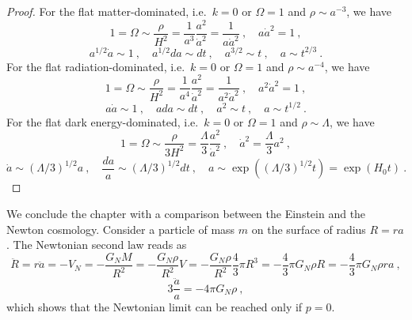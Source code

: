     \begin{proof}
        For the flat matter-dominated, i.e.~$k = 0$ or $\Omega = 1$ and $\rho \sim a^{-3}$, we have 
        \begin{equation*}
            1 = \Omega \sim \frac{\rho}{H^2} = \frac{1}{a^3} \frac{a^2}{\dot a^2}= \frac{1}{a \dot a^2} ~, \quad a \dot a^2 = 1 ~,
        \end{equation*}
        \begin{equation*}
            a^{1/2} \dot a \sim 1 ~, \quad a^{1/2} da \sim dt ~, \quad a^{3/2} \sim t ~, \quad a \sim t^{2/3} ~.
        \end{equation*}
        For the flat radiation-dominated, i.e.~$k = 0$ or $\Omega = 1$ and $\rho \sim a^{-4}$, we have 
        \begin{equation*}
            1 = \Omega \sim \frac{\rho}{H^2} = \frac{1}{a^4} \frac{a^2}{\dot a^2}= \frac{1}{a^2 \dot a^2} ~, \quad a^2 \dot a^2 = 1 ~,
        \end{equation*}
        \begin{equation*}
            a \dot a \sim 1 ~, \quad a da \sim dt ~, \quad a^2 \sim t ~, \quad a \sim t^{1/2} ~.
        \end{equation*}
        For the flat dark energy-dominated, i.e.~$k = 0$ or $\Omega = 1$ and $\rho \sim \Lambda$, we have 
        \begin{equation*}
            1 = \Omega \sim \frac{\rho}{3 H^2} = \frac{\Lambda}{3} \frac{a^2}{\dot a^2} ~, \quad \dot a^2 = \frac{\Lambda}{3} a^2 ~,
        \end{equation*}
        \begin{equation*}
            \dot a \sim (\Lambda/3)^{1/2} a ~, \quad \frac{da}{a} \sim (\Lambda/3)^{1/2} dt ~, \quad a \sim \exp ( (\Lambda/3)^{1/2} t ) = \exp ( H_0 t ) ~.
        \end{equation*}
    \end{proof}

    We conclude the chapter with a comparison between the Einstein and the Newton cosmology. Consider a particle of mass $m$ on the surface of radius $R = r a$. The Newtonian second law reads as 
    \begin{equation*}
        \ddot R = r \ddot a = -V_N = - \frac{G_N M}{R^2} = - \frac{G_N \rho}{R^2} V = - \frac{G_N \rho}{R^2} \frac{4}{3} \pi R^3 = - \frac{4}{3} \pi G_N \rho R = - \frac{4}{3} \pi G_N \rho r a ~, 
    \end{equation*}
    \begin{equation*}
        3 \frac{\ddot a}{a} = - 4 \pi G_N \rho ~,
    \end{equation*}
    which shows that the Newtonian limit can be reached only if $p = 0$.

